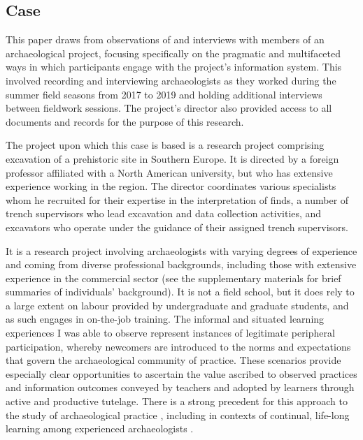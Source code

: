 \documentclass{article}
\begin{document}
\subsection{Case}

This paper draws from observations of and interviews with members of an
archaeological project, focusing specifically on the pragmatic and
multifaceted ways in which participants engage with the project's
information system. This involved recording and interviewing
archaeologists as they worked during the summer field seasons from 2017
to 2019 and holding additional interviews between fieldwork sessions.
The project's director also provided access to all documents and records
for the purpose of this research.

The project upon which this case is based is a research project
comprising excavation of a prehistoric site in Southern Europe. It is
directed by a foreign professor affiliated with a North American
university, but who has extensive experience working in the region. The
director coordinates various specialists whom he recruited for their
expertise in the interpretation of finds, a number of trench supervisors
who lead excavation and data collection activities, and excavators who
operate under the guidance of their assigned trench supervisors.

It is a research project involving archaeologists with varying degrees
of experience and coming from diverse professional backgrounds,
including those with extensive experience in the commercial sector (see
the supplementary materials for brief summaries of individuals'
background). It is not a field school, but it does rely to a large
extent on labour provided by undergraduate and graduate students, and as
such engages in on-the-job training. The informal and situated learning
experiences I was able to observe represent instances of legitimate
peripheral participation, whereby newcomers are introduced to the norms
and expectations that govern the archaeological community of practice.
These scenarios provide especially clear opportunities to ascertain the
value ascribed to observed practices and information outcomes conveyed
by teachers and adopted by learners through active and productive
tutelage. There is a strong precedent for this approach to the study of
archaeological practice
\parencites[cf.][]{everill2007,goodwin1994,goodwin2010,morgan2018},
including in contexts of continual, life-long learning among experienced
archaeologists \parencites[cf.][]{edgeworth1991,gero1994,graham2019}.
\end{document}
